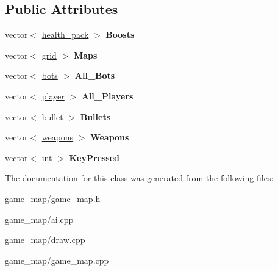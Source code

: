 \subsection*{Public Attributes}
\begin{DoxyCompactItemize}
\item 
\hypertarget{classgame__map_af1b2f8790f9f46427cc3681ec5f1c7b7}{vector$<$ \hyperlink{classhealth__pack}{health\+\_\+pack} $>$ {\bfseries Boosts}}\label{classgame__map_af1b2f8790f9f46427cc3681ec5f1c7b7}

\item 
\hypertarget{classgame__map_af39317bd2e916fd2c3acf23237facaca}{vector$<$ \hyperlink{classgrid}{grid} $>$ {\bfseries Maps}}\label{classgame__map_af39317bd2e916fd2c3acf23237facaca}

\item 
\hypertarget{classgame__map_a041dfc0f8e669ea56ad233e0bb894bfb}{vector$<$ \hyperlink{classbots}{bots} $>$ {\bfseries All\+\_\+\+Bots}}\label{classgame__map_a041dfc0f8e669ea56ad233e0bb894bfb}

\item 
\hypertarget{classgame__map_a18c215a244acc26ca8948be3f0ffa7d0}{vector$<$ \hyperlink{classplayer}{player} $>$ {\bfseries All\+\_\+\+Players}}\label{classgame__map_a18c215a244acc26ca8948be3f0ffa7d0}

\item 
\hypertarget{classgame__map_adfbaf4b7d5da1b507cef4ffe8233158a}{vector$<$ \hyperlink{classbullet}{bullet} $>$ {\bfseries Bullets}}\label{classgame__map_adfbaf4b7d5da1b507cef4ffe8233158a}

\item 
\hypertarget{classgame__map_ab62a31f5bfbc5e828bbcc5abe394e7bf}{vector$<$ \hyperlink{classweapons}{weapons} $>$ {\bfseries Weapons}}\label{classgame__map_ab62a31f5bfbc5e828bbcc5abe394e7bf}

\item 
\hypertarget{classgame__map_ab91830e7a3dbf9d6b97dd4388b15907e}{vector$<$ int $>$ {\bfseries Key\+Pressed}}\label{classgame__map_ab91830e7a3dbf9d6b97dd4388b15907e}

\end{DoxyCompactItemize}


The documentation for this class was generated from the following files\+:\begin{DoxyCompactItemize}
\item 
game\+\_\+map/game\+\_\+map.\+h\item 
game\+\_\+map/ai.\+cpp\item 
game\+\_\+map/draw.\+cpp\item 
game\+\_\+map/game\+\_\+map.\+cpp\end{DoxyCompactItemize}
